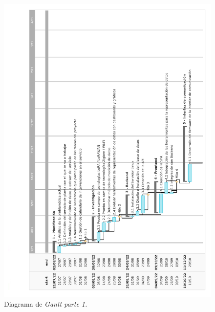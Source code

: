 \documentclass[
11pt%
]{charter}
\begin{document}
\begin{figure}[htpb]
\centering
\includegraphics[width=1\textwidth]{./Figuras/gantt_A5_1_ed2.pdf}
\caption{Diagrama de \textit{Gantt parte 1.}}
\label{fig:gantt2}
\end{figure}


\end{document}
